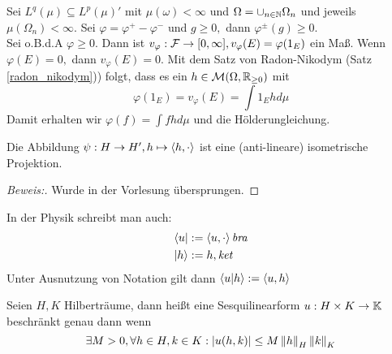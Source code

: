 \begin{ex}
Sei $L^q(\mu) \subseteq L^p(\mu)'$ mit $\mu(\omega) < \infty$ und $\Omega = \cup_{n \in \mathbb{N}} \Omega_n$ und jeweils $\mu(\Omega_n) < \infty.$ Sei $\varphi = \varphi^+ - \varphi^-$ und $g \geq 0,$ dann $\varphi^{\pm}(g) \geq 0.$ \\
Sei o.B.d.A $\varphi \geq 0.$ Dann ist $v_{\varphi}: \mathcal{F} \to [0, \infty], v_{\varphi}(E) = \varphi(1_E)$ ein Maß. Wenn $\varphi(E) = 0,$ dann $v_{\varphi}(E) = 0.$ Mit dem Satz von Radon-Nikodym (Satz \ref{radon_nikodym})) folgt, dass es ein $h \in \mathcal{M}(\Omega, \mathbb{R}_{\geq 0})$ mit \[\varphi(1_E) = v_{\varphi}(E) = \int1_E h d\mu\]
Damit erhalten wir $\varphi(f) = \int fhd\mu$ und die Hölderungleichung.
\end{ex}

\begin{theorem} \label{riez2}
Die Abbildung $\psi: H \to H', h \mapsto \left\langle h, \cdot\right\rangle$ ist eine (anti-lineare) isometrische Projektion.

\begin{proof}[Beweis:] Wurde in der Vorlesung übersprungen.
\end{proof}
\end{theorem}


\begin{rem}
    In der Physik schreibt man auch:
    \begin{align*}
        & \langle u | := \left\langle u, \cdot\right\rangle \textit{bra} \\
        & |h\rangle := h, \textit{ket} \\
    \end{align*} Unter Ausnutzung von Notation gilt dann $\left\langle u | h\right\rangle := \left\langle u, h\right\rangle$
\end{rem}

\begin{definition} \label{sesq_bound}
    Seien $H, K$ Hilberträume, dann heißt eine Sesquilinearform $u: H \times K \to \mathbb{K}$ beschränkt genau dann wenn \[\exists M > 0, \forall h \in H, k \in K: \left\lvert u(h, k) \right\rvert \leq M \left\lVert h\right\rVert_H \left\lVert k\right\rVert_K\]
\end{definition}

